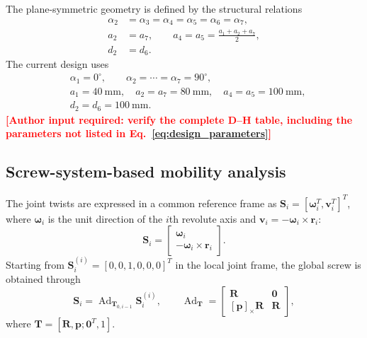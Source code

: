 \documentclass[a4paper,fleqn]{cas-sc}
\newcommand{\missing}[1]{\textcolor{red}{\textbf{[#1]}}}
\begin{document}
The plane-symmetric geometry is defined by the structural relations
\begin{equation}
\begin{aligned}
\alpha_2&=\alpha_3=\alpha_4=\alpha_5=\alpha_6=\alpha_7,\\
a_2&=a_7,\qquad
a_4=a_5=\frac{a_1+a_2+a_7}{2},\\
d_2&=d_6.
\end{aligned}
\label{eq:geometric_constraints}
\end{equation}
The current design uses
\begin{equation}
\begin{aligned}
&\alpha_1=0^\circ,\qquad
\alpha_2=\cdots=\alpha_7=90^\circ,\\
&a_1=40~\mathrm{mm},\quad a_2=a_7=80~\mathrm{mm},\quad
a_4=a_5=100~\mathrm{mm},\\
&d_2=d_6=100~\mathrm{mm}.
\end{aligned}
\label{eq:design_parameters}
\end{equation}
\missing{Author input required: verify the complete D--H table, including
the parameters not listed in Eq.~\eqref{eq:design_parameters}}

\subsection{Screw-system-based mobility analysis}

The joint twists are expressed in a common reference frame as
\(\mathbf S_i=[\boldsymbol{\omega}_i^T,\mathbf v_i^T]^T\), where
\(\boldsymbol{\omega}_i\) is the unit direction of the \(i\)th revolute axis
and \(\mathbf v_i=-\boldsymbol{\omega}_i\times\mathbf r_i\):
\begin{equation}
\mathbf S_i=
\begin{bmatrix}
\boldsymbol{\omega}_i\\
-\boldsymbol{\omega}_i\times\mathbf r_i
\end{bmatrix}.
\label{eq:screw_definition}
\end{equation}
Starting from \(\mathbf S_i^{(i)}=[0,0,1,0,0,0]^T\) in the local joint frame,
the global screw is obtained through
\begin{equation}
\mathbf S_i=\operatorname{Ad}_{\mathbf T_{0,i-1}}\mathbf S_i^{(i)},\qquad
\operatorname{Ad}_{\mathbf T}=
\begin{bmatrix}
\mathbf R&\mathbf 0\\
[\mathbf p]_{\times}\mathbf R&\mathbf R
\end{bmatrix},
\label{eq:adjoint_mapping}
\end{equation}
where \(\mathbf T=[\mathbf R,\mathbf p;\mathbf 0^T,1]\).
\end{document}
